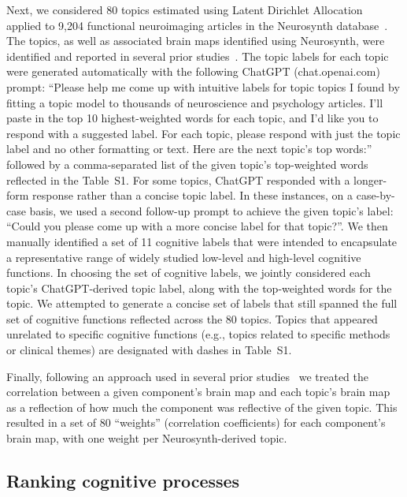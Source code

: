 \documentclass[english, 11pt]{article}
\newcommand{\topics}{S1}
\begin{document}
Next, we considered 80 topics estimated using Latent Dirichlet
Allocation~\citep{BleiEtal03} applied to 9,204 functional neuroimaging articles
in the Neurosynth database~\citep{RubiEtal17}. The topics, as well as
associated brain maps identified using Neurosynth, were identified and reported
in several prior studies~\citep{FoxEtal14, SulEtal17, ChenEtal20}. The topic
labels for each topic were generated automatically with the following ChatGPT
(chat.openai.com) prompt: ``Please help me come up with intuitive labels for
topic topics I found by fitting a topic model to thousands of neuroscience and
psychology articles. I'll paste in the top 10 highest-weighted words for each
topic, and I'd like you to respond with a suggested label. For each topic,
please respond with just the topic label and no other formatting or text. Here
are the next topic's top words:'' followed by a comma-separated list of the
given topic's top-weighted words reflected in the Table~\topics. For some
topics, ChatGPT responded with a longer-form response rather than a concise
topic label. In these instances, on a case-by-case basis, we used a second
follow-up prompt to achieve the given topic's label: ``Could you please come up
with a more concise label for that topic?''. We then manually identified a set
of 11 cognitive labels that were intended to encapsulate a representative range
of widely studied low-level and high-level cognitive functions. In choosing the
set of cognitive labels, we jointly considered each topic's ChatGPT-derived
topic label, along with the top-weighted words for the topic. We attempted to
generate a concise set of labels that still spanned the full set of cognitive
functions reflected across the 80 topics. Topics that appeared unrelated to
specific cognitive functions (e.g., topics related to specific methods or
clinical themes) are designated with dashes in Table~\topics.

Finally, following an approach used in several prior studies~\citep{FoxEtal14,
SulEtal17, ChenEtal20} we treated the correlation between a given component's
brain map and each topic's brain map as a reflection of how much the component
was reflective of the given topic. This resulted in a set of 80 ``weights''
(correlation coefficients) for each component's brain map, with one weight per
Neurosynth-derived topic.

\subsection*{Ranking cognitive processes}
\end{document}
